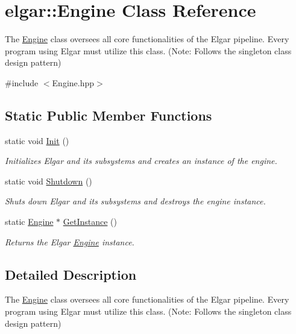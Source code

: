 \hypertarget{classelgar_1_1Engine}{}\section{elgar\+:\+:Engine Class Reference}
\label{classelgar_1_1Engine}


The \hyperlink{classelgar_1_1Engine}{Engine} class oversees all core functionalities of the Elgar pipeline. Every program using Elgar must utilize this class. (Note\+: Follows the singleton class design pattern)  




{\ttfamily \#include $<$Engine.\+hpp$>$}

\subsection*{Static Public Member Functions}
\begin{DoxyCompactItemize}
\item 
static void \hyperlink{classelgar_1_1Engine_ad7581c87901137b12fcbffe62ac711b1}{Init} ()
\begin{DoxyCompactList}\small\item\em Initializes Elgar and its subsystems and creates an instance of the engine. \end{DoxyCompactList}\item 
static void \hyperlink{classelgar_1_1Engine_a73d30730db3c8a9d132caa0c3cfe8e95}{Shutdown} ()
\begin{DoxyCompactList}\small\item\em Shuts down Elgar and its subsystems and destroys the engine instance. \end{DoxyCompactList}\item 
static \hyperlink{classelgar_1_1Engine}{Engine} $\ast$ \hyperlink{classelgar_1_1Engine_ac1cddebb329f111c5c084d7f0cb2f126}{Get\+Instance} ()
\begin{DoxyCompactList}\small\item\em Returns the Elgar \hyperlink{classelgar_1_1Engine}{Engine} instance. \end{DoxyCompactList}\end{DoxyCompactItemize}


\subsection{Detailed Description}
The \hyperlink{classelgar_1_1Engine}{Engine} class oversees all core functionalities of the Elgar pipeline. Every program using Elgar must utilize this class. (Note\+: Follows the singleton class design pattern) 

